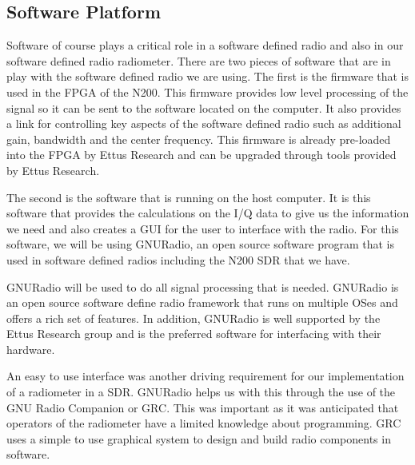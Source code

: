 \subsection{Software Platform} 

Software of course plays a critical role in a software defined radio and also in our software defined radio radiometer.  There are two pieces of software that are in play with the software defined radio we are using.  The first is the firmware that is used in the FPGA of the N200.  This firmware provides low level processing of the signal so it can be sent to the software located on the computer.  It also provides a link for controlling key aspects of the software defined radio such as additional gain, bandwidth and the center frequency.  This firmware is already pre-loaded into the FPGA by Ettus Research and can be upgraded through tools provided by Ettus Research.

The second is the software that is running on the host computer.  It is this software that provides the calculations on the I/Q data to give us the information we need and also creates a GUI for the user to interface with the radio.  For this software, we will be using GNURadio, an open source software program that is used in software defined radios including the N200 SDR that we have.  

GNURadio will be used to do all signal processing that is needed.  GNURadio is an open source software define radio framework that runs on multiple OSes and offers a rich set of features.  In addition, GNURadio is well supported by the Ettus Research group and is the preferred software for interfacing with their hardware.  

An easy to use interface was another driving requirement for our implementation of a radiometer in a SDR.  GNURadio helps us with this through the use of the GNU Radio Companion or GRC.  This was important as it was anticipated that operators of the radiometer have a limited knowledge about programming.  GRC uses a simple to use graphical system to design and build radio components in software.



